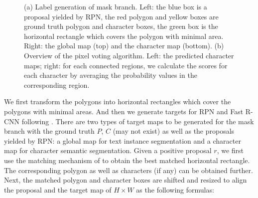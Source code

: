 \documentclass[runningheads]{llncs}
\begin{document}

\begin{figure}[!b]
\begin{center}
\captionsetup[subfigure]{justification=centering}
    \centering
{}
\end{center}
 \caption{(a) Label generation of mask branch. Left: the blue box is a proposal yielded by RPN, the red polygon and yellow boxes are ground truth polygon and character boxes, the green box is the horizontal rectangle which covers the polygon with minimal area. Right: the global map (top) and the character map (bottom). (b) Overview of the pixel voting algorithm. Left: the predicted character maps; right: for each connected regions, we calculate the scores for each character by averaging the probability values in the corresponding region.}
\label{fig:denser-box}
\end{figure}

We first transform the polygons into horizontal rectangles which cover the polygons with minimal areas. And then we generate targets for RPN and Fast R-CNN following \cite{fastrcnn,ren2015faster,lin2017feature}. There are two types of target maps to be generated for the mask branch with the ground truth $P$, $C$ (may not exist) as well as the proposals yielded by RPN: a global map for text instance segmentation and a character map for character semantic segmentation. 
Given a positive  proposal $r$, we first use the matching mechanism of \cite{fastrcnn,ren2015faster,lin2017feature} to obtain the best matched horizontal rectangle. The corresponding polygon as well as characters (if any) can be obtained further. Next, the matched polygon and character boxes are shifted and resized to align the proposal and the target map of $H\times W$ as  the following formulas:
\end{document}
